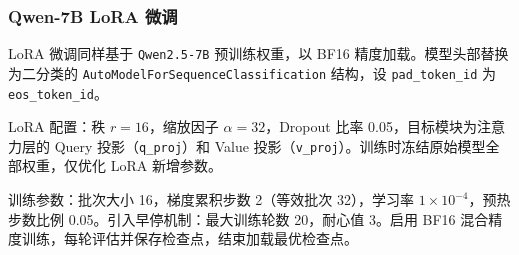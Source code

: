 \subsubsection{Qwen-7B LoRA 微调}

LoRA 微调同样基于 \texttt{Qwen2.5-7B} 预训练权重，以 BF16 精度加载。模型头部替换为二分类的 \texttt{AutoModelForSequenceClassification} 结构，设 \texttt{pad\_token\_id} 为 \texttt{eos\_token\_id}。

LoRA 配置：秩 $r = 16$，缩放因子 $\alpha = 32$，Dropout 比率 0.05，目标模块为注意力层的 Query 投影（\texttt{q\_proj}）和 Value 投影（\texttt{v\_proj}）。训练时冻结原始模型全部权重，仅优化 LoRA 新增参数。

训练参数：批次大小 16，梯度累积步数 2（等效批次 32），学习率 $1 \times 10^{-4}$，预热步数比例 0.05。引入早停机制：最大训练轮数 20，耐心值 3。启用 BF16 混合精度训练，每轮评估并保存检查点，结束加载最优检查点。
